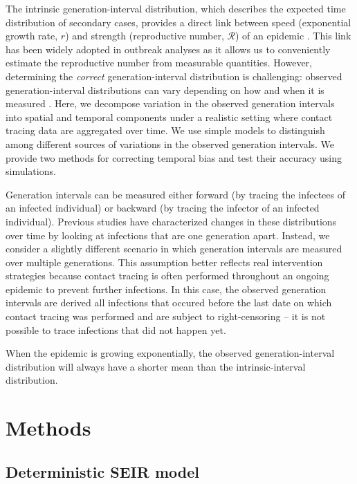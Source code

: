 \documentclass[12pt]{article}
\begin{document}
The intrinsic generation-interval distribution, which describes the expected time distribution of secondary cases, provides a direct link between speed (exponential growth rate, $r$) and strength (reproductive number, $\mathcal R$) of an epidemic \citep{wallinga2007generation, park2019practical}.
This link has been widely adopted in outbreak analyses as it allows us to conveniently estimate the reproductive number from measurable quantities.
However, determining the \emph{correct} generation-interval distribution is challenging: observed generation-interval distributions can vary depending on how and when it is measured \citep{nishiura2010time, tomba2010some, champredon2015intrinsic, britton2019estimation}.
Here, we decompose variation in the observed generation intervals into spatial and temporal components under a realistic setting where contact tracing data are aggregated over time.
We use simple models to distinguish among different sources of variations in the observed generation intervals.
We provide two methods for correcting temporal bias and test their accuracy using simulations.

Generation intervals can be measured either forward (by tracing the infectees of an infected individual) or backward (by tracing the infector of an infected individual).
Previous studies have characterized changes in these distributions over time by looking at infections that are one generation apart.
Instead, we consider a slightly different scenario in which generation intervals are measured over multiple generations.
This assumption better reflects real intervention strategies because contact tracing is often performed throughout an ongoing epidemic to prevent further infections. 
In this case, the observed generation intervals are derived all infections that occured before the last date on which contact tracing was performed and are subject to right-censoring -- it is not possible to trace infections that did not happen yet.

When the epidemic is growing exponentially, the observed generation-interval distribution will always have a shorter mean than the intrinsic-interval distribution. 




\section{Methods}

\subsection{Deterministic SEIR model}
\end{document}
